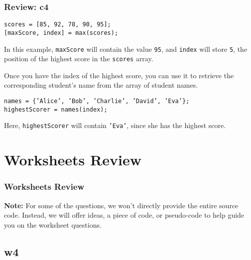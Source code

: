 \documentclass[
	11pt, %
]{beamer}
\begin{document}
\begin{frame}
	\frametitle{Review: c4}
    
    \texttt{scores = [85, 92, 78, 90, 95];} \\
    \texttt{[maxScore, index] = max(scores);}

    \vspace{0.5cm}

    In this example, \texttt{maxScore} will contain the value \texttt{95}, and \texttt{index} will store \texttt{5}, the position of the highest score in the \texttt{scores} array. 
    
    \vspace{0.5cm}

    Once you have the index of the highest score, you can use it to retrieve the corresponding student's name from the array of student names. \\

    \vspace{0.5cm}
    
    \texttt{names = \{'Alice', 'Bob', 'Charlie', 'David', 'Eva'\};} \\
    \texttt{highestScorer = names(index);} \\

    \vspace{0.5cm}
    
    Here, \texttt{highestScorer} will contain \texttt{'Eva'}, since she has the highest score.

\end{frame}

\section{Worksheets Review}

\begin{frame}
	\frametitle{Worksheets Review}

	\noindent
    \textbf{Note:} For some of the questions, we won't directly provide the entire source code. Instead, we will offer ideas, a piece of code, or pseudo-code to help guide you on the worksheet questions.



\end{frame}


\subsection{w4}
\end{document}
